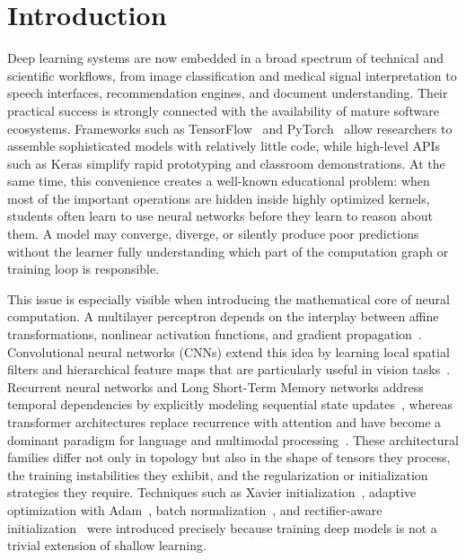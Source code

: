 \documentclass[]{ceurart}
\begin{document}
\section{Introduction}
Deep learning systems are now embedded in a broad spectrum of technical and scientific workflows, from image classification and medical signal interpretation to speech interfaces, recommendation engines, and document understanding. Their practical success is strongly connected with the availability of mature software ecosystems. Frameworks such as TensorFlow~\cite{tensorflow} and PyTorch~\cite{pytorch} allow researchers to assemble sophisticated models with relatively little code, while high-level APIs such as Keras simplify rapid prototyping and classroom demonstrations. At the same time, this convenience creates a well-known educational problem: when most of the important operations are hidden inside highly optimized kernels, students often learn to use neural networks before they learn to reason about them. A model may converge, diverge, or silently produce poor predictions without the learner fully understanding which part of the computation graph or training loop is responsible.

This issue is especially visible when introducing the mathematical core of neural computation. A multilayer perceptron depends on the interplay between affine transformations, nonlinear activation functions, and gradient propagation~\cite{rumelhart1986,cybenko1989,glorot2010}. Convolutional neural networks (CNNs) extend this idea by learning local spatial filters and hierarchical feature maps that are particularly useful in vision tasks~\cite{lecun1998,krizhevsky2012,vgg,googlenet,resnet}. Recurrent neural networks and Long Short-Term Memory networks address temporal dependencies by explicitly modeling sequential state updates~\cite{hochreiter1997}, whereas transformer architectures replace recurrence with attention and have become a dominant paradigm for language and multimodal processing~\cite{vaswani2017}. These architectural families differ not only in topology but also in the shape of tensors they process, the training instabilities they exhibit, and the regularization or initialization strategies they require. Techniques such as Xavier initialization~\cite{glorot2010}, adaptive optimization with Adam~\cite{kingma2015}, batch normalization~\cite{ioffe2015}, and rectifier-aware initialization~\cite{he2015} were introduced precisely because training deep models is not a trivial extension of shallow learning.
\end{document}
